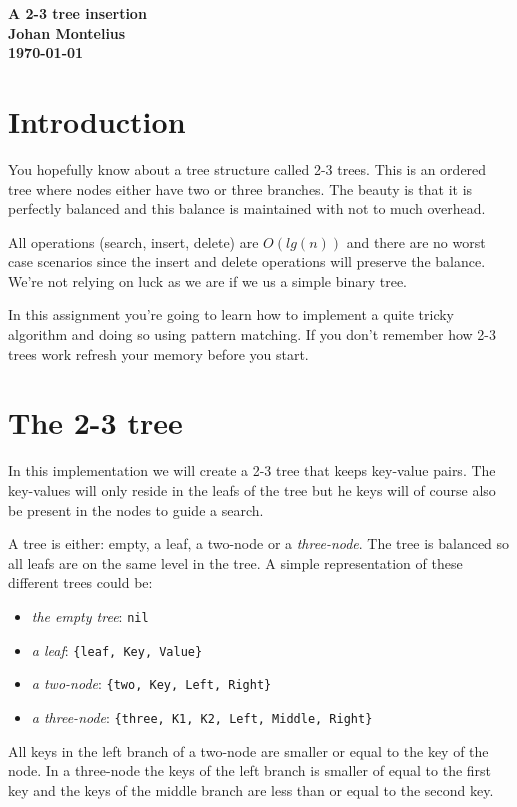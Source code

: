 \documentclass[a4paper,11pt]{article}
\newcommand{\nnsection}[1]{
\section*{#1}
\addcontentsline{toc}{section}{#1}
}
\begin{document}
\begin{center}
\vspace{20pt}
\textbf{\large A 2-3 tree insertion}\\
\vspace{10pt}
\textbf{Johan Montelius}\\ 
\vspace{10pt}
\textbf{\today}
\end{center}

\nnsection{Introduction}

You hopefully know about a tree structure called 2-3 trees. This is an
ordered tree where nodes either have two or three branches. The beauty
is that it is perfectly balanced and this balance is maintained with
not to much overhead. 

All operations (search, insert, delete) are $O(lg(n))$ and there are
no worst case scenarios since the insert and delete operations will
preserve the balance. We're not relying on luck as we are if we us a
simple binary tree.

In this assignment you're going to learn how to implement a quite
tricky algorithm and doing so using pattern matching. If you don't
remember how 2-3 trees work refresh your memory before you start.

\section{The 2-3 tree}

In this implementation we will create a 2-3 tree that keeps key-value
pairs. The key-values will only reside in the leafs of the tree but he
keys will of course also be present in the nodes to guide a search.

A tree is either: empty, a leaf, a two-node or a {\em three-node}. The
tree is balanced so all leafs are on the same level in the tree. A
simple representation of these different trees could be:

\begin{itemize}
  \item {\em the empty tree}: {\tt nil}
  \item {\em a leaf}: {\tt \{leaf, Key, Value\}}  
  \item {\em a two-node}: {\tt \{two, Key, Left, Right\}}
  \item {\em a three-node}: {\tt \{three, K1, K2, Left, Middle, Right\}}      
\end{itemize}

All keys in the left branch of a two-node are smaller or equal to the
key of the node. In a three-node the keys of the left branch is
smaller of equal to the first key and the keys of the middle branch are
less than or equal to the second key.
\end{document}
